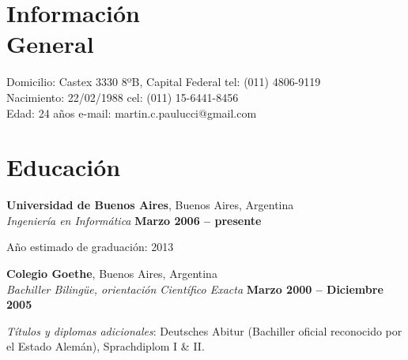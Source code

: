 \documentclass[margin,line]{resume}
\begin{document}
\begin{resume}

    \section{\mysidestyle Información \\General}

    Domicilio: Castex 3330 8ºB, Capital Federal                            \hfill tel: (011) 4806-9119         \vspace{0mm}\\\vspace{0mm}%
    Nacimiento: 22/02/1988                          \hfill cel: (011) 15-6441-8456         \vspace{0mm}\\\vspace{0mm}%
    Edad: 24 años      \hfill e-mail: martin.c.paulucci@gmail.com  \vspace{0mm}\\\vspace{-4.5mm}%

    \section{\mysidestyle Educación}

    \textbf{Universidad de Buenos Aires}, Buenos Aires, Argentina \vspace{2mm}\\\vspace{1mm}%
    \textsl{Ingeniería en Informática} \hfill \textbf{ Marzo 2006 -- presente}\vspace{-3mm}\\\vspace{-1mm}%
    \begin{list2}
        \item Año estimado de graduación: 2013
    \end{list2}\vspace{-1.5mm}

    \textbf{Colegio Goethe}, Buenos Aires, Argentina \vspace{2mm}\\\vspace{1mm}%
    \textsl{Bachiller Bilingüe, orientación Científico Exacta} \hfill \textbf{ Marzo 2000 -- Diciembre 2005}\vspace{-3mm}\\\vspace{-1mm}%
    \begin{list2}
        \item \textit{Títulos y diplomas adicionales}: Deutsches Abitur (Bachiller oficial reconocido por el Estado Alemán), Sprachdiplom I \& II.
    \end{list2}\vspace{-1.5mm}


\end{resume}
\end{document}
